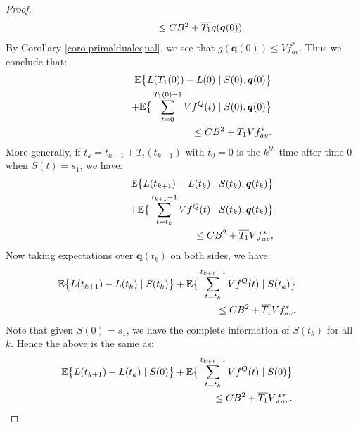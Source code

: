 \documentclass[journal]{IEEEtran}
\newcommand{\expect}[1]{\mathbb{E}\big\{#1\big\}}
\newcommand{\bv}[1]{{\boldsymbol{#1} }}
\begin{document}
\begin{proof}
\begin{eqnarray}
\hspace{-.3in}&& \qquad\qquad\quad \leq  CB^2 + \overline{T_{1}} g(\bv{q}(0)).\nonumber
\end{eqnarray}
By Corollary \ref{coro:primaldualequal}, we see that $g(\bv{q}(0))\leq Vf^*_{av}$. Thus we conclude that:
\begin{eqnarray}
\hspace{-.3in}&&\expect{L(T_{1}(0))-L(0)\left.|\right. S(0), \bv{q}(0)} \\
\hspace{-.3in}&& \qquad\qquad\quad+ \expect{\sum_{t=0}^{T_{1}(0)-1}Vf^Q(t)\left.|\right. S(0), \bv{q}(0)}\nonumber\\
\hspace{-.3in}&& \qquad\qquad\quad \leq  CB^2 + \overline{T_{1}} Vf^*_{av}.\nonumber
\end{eqnarray}
More generally, if $t_{k}=t_{k-1}+T_{i}(t_{k-1})$ with $t_0=0$ is the $k^{th}$ time after time $0$ when $S(t)=s_1$, we have:
\begin{eqnarray}
\hspace{-.3in}&&\expect{L(t_{k+1})-L(t_{k})\left.|\right. S(t_{k}), \bv{q}(t_{k})} \\
\hspace{-.3in}&& \qquad\qquad\quad+ \expect{\sum_{t=t_{k}}^{t_{k+1}-1}Vf^Q(t)\left.|\right. S(t_{k}), \bv{q}(t_{k})}\nonumber\\
\hspace{-.3in}&& \qquad\qquad\quad \leq CB^2 + \overline{T_{1}} Vf^*_{av},\nonumber
\end{eqnarray}
Now taking expectations over $\bv{q}(t_{k})$ on both sides, we have:
\begin{eqnarray}
\hspace{-.3in}&&\expect{L(t_{k+1})-L(t_k)\left.|\right. S(t_k)} + \expect{\sum_{t=t_k}^{t_{k+1}-1}Vf^Q(t)\left.|\right. S(t_{k})}\nonumber\\
\hspace{-.3in}&& \qquad\qquad\qquad\qquad\qquad\qquad\quad \leq CB^2 + \overline{T_{1}} Vf^*_{av}.\nonumber
\end{eqnarray}
Note that given $S(0)=s_1$, we have the complete information of $S(t_{k})$ for all $k$. Hence the above is the same as: 
\begin{eqnarray}
\hspace{-.3in}&&\expect{L(t_{k+1})-L(t_k)\left.|\right. S(0)}+ \expect{\sum_{t=t_k}^{t_{k+1}-1}Vf^Q(t)\left.|\right. S(0)} \nonumber\\
\hspace{-.3in}&& \qquad\qquad \qquad\qquad \qquad\qquad\quad \leq CB^2 + \overline{T_{1}} Vf^*_{av}. 

\end{eqnarray}
\end{proof}
\end{document}
